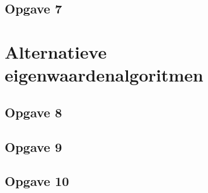 \documentclass[a4paper, 12pt, titlepage]{report}
\begin{document}
\subsection{Opgave 7}

\section{Alternatieve eigenwaardenalgoritmen}

\subsection{Opgave 8}

\subsection{Opgave 9}

\subsection{Opgave 10}
\end{document}
